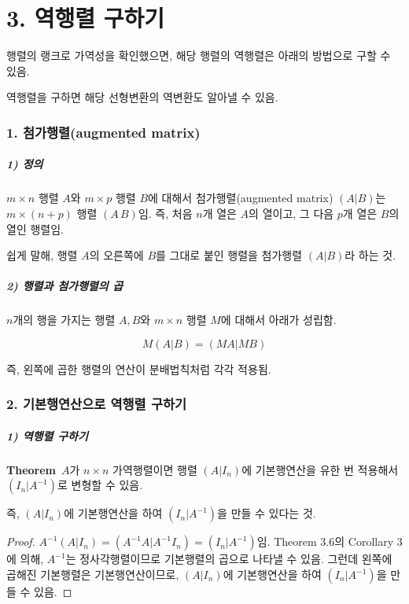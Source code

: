\newpage


\part*{3. 역행렬 구하기}

행렬의 랭크로 가역성을 확인했으면, 해당 행렬의 역행렬은 아래의 방법으로 구할 수 있음.

역행렬을 구하면 해당 선형변환의 역변환도 알아낼 수 있음.

\section*{1. 첨가행렬(augmented matrix)}
\subsubsection*{1) 정의\\}
\begin{DEF}
$m \times n$ 행렬 $A$와 $m \times p$ 행렬 $B$에 대해서 첨가행렬(augmented matrix) $(A|B)$는 $m \times (n+p)$ 행렬 $(A\,B)$임. 즉, 처음 $n$개 열은 $A$의 열이고, 그 다음 $p$개 열은 $B$의 열인 행렬임.
\end{DEF}

쉽게 말해, 행렬 $A$의 오른쪽에 $B$를 그대로 붙인 행렬을 첨가행렬 $(A|B)$라 하는 것.

\subsubsection*{2) 행렬과 첨가행렬의 곱}
$n$개의 행을 가지는 행렬 $A,B$와 $m \times n$ 행렬 $M$에 대해서 아래가 성립함.

\[
M(A|B)=(MA|MB)
\]

즉, 왼쪽에 곱한 행렬의 연산이 분배법칙처럼 각각 적용됨.


\section*{2. 기본행연산으로 역행렬 구하기}
\subsubsection*{1) 역행렬 구하기}
\textbf{Theorem}\, $A$가 $n \times n$ 가역행렬이면 행렬 $(A|I_n)$에 기본행연산을 유한 번 적용해서 $(I_n|A^{-1})$로 변형할 수 있음.

즉, $(A|I_n)$에 기본행연산을 하여 $(I_n|A^{-1})$을 만들 수 있다는 것.

\begin{proof}
$A^{-1}(A|I_n)=(A^{-1}A|A^{-1}I_n)=(I_n|A^{-1})$임. Theorem 3.6의 Corollary 3에 의해, $A^{-1}$는 정사각행렬이므로 기본행렬의 곱으로 나타낼 수 있음. 그런데 왼쪽에 곱해진 기본행렬은 기본행연산이므로, $(A|I_n)$에 기본행연산을 하여 $(I_n|A^{-1})$을 만들 수 있음.
\end{proof}

